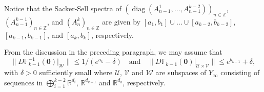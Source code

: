 \documentclass[reqno, a4paper, 10pt]{amsart}
\theoremstyle{plain}
\numberwithin{equation}{section}
\theoremstyle{remark}
\DeclareMathOperator{\diag}{diag}
\begin{document}
Notice that the Sacker-Sell spectra of $(\diag (A_{n-1}^1, \ldots, A_{n-1}^{k-2}))_{n\in \mathbb Z}$, $(A_{n-1}^{k-1})_{n\in \mathbb Z}$, and $(A_n^k)_{n\in \mathbb Z}$ are given by $[a_1, b_1]\cup \ldots \cup [a_{k-2}, b_{k-2}]$, $[a_{k-1}, b_{k-1}]$, and $[a_k, b_k]$, respectively. 

From the discussion in the preceding paragraph, we may assume that 
\[
\|D\mathbb F_{k-1}^{-1}(\mathbf 0)\rvert_{\mathcal W}\|\le 1/(e^{a_k}-\delta) \quad \text{and} \quad \|D\mathbb F_{k-1}(\mathbf 0)\rvert_{\mathcal U\times \mathcal V}\|\le e^{b_{k-1}}+\delta,
\]
with $\delta>0$ sufficiently small where $\mathcal U$, $\mathcal V$ and $\mathcal W$ are subspaces of $Y_\infty$ consisting of sequences in $\bigoplus_{i=1}^{k-2}\mathbb R^{d_i}$, $\mathbb R^{d_{k-1}}$ and $\mathbb R^{d_k}$, respectively.
\end{document}
